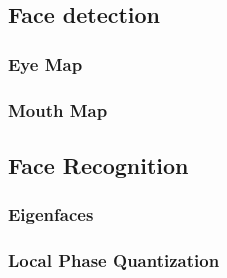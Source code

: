 \subsection{Face detection}
\subsubsection{Eye Map}
\label{sub:FaceDetection}


\subsubsection{Mouth Map}



\subsection{Face Recognition}
\label{sub:FaceRecognition}


\subsubsection{Eigenfaces}
\label{subs:Eigenfaces}


\subsubsection{Local Phase Quantization}
\label{subs:LocalPhaseQuantization}

